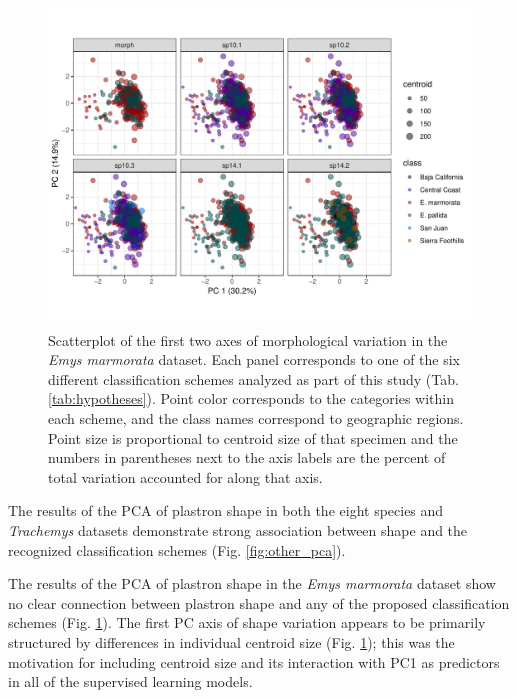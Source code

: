 \documentclass[fleqn,10pt,lineno]{wlpeerj} %
\begin{document}
\afterpage{\clearpage}
\begin{figure}[ht]
  \centering
  \includegraphics[height = \textheight, width = \textwidth, keepaspectratio = true]{figure/emys_pc_graph}
  \caption{Scatterplot of the first two axes of morphological variation in the \textit{Emys marmorata} dataset. Each panel corresponds to one of the six different classification schemes analyzed as part of this study (Tab. \ref{tab:hypotheses}). Point color corresponds to the categories within each scheme, and the class names correspond to geographic regions. Point size is proportional to centroid size of that specimen and the numbers in parentheses next to the axis labels are the percent of total variation accounted for along that axis.}
  \label{fig:emys_pca}
\end{figure}

The results of the PCA of plastron shape in both the eight species and \textit{Trachemys} datasets demonstrate strong association between shape and the recognized classification schemes (Fig. \ref{fig:other_pca}).

The results of the PCA of plastron shape in the \textit{Emys marmorata} dataset show no clear connection between plastron shape and any of the proposed classification schemes (Fig. \ref{fig:emys_pca}). The first PC axis of shape variation appears to be primarily structured by differences in individual centroid size (Fig. \ref{fig:emys_pca}); this was the motivation for including centroid size and its interaction with PC1 as predictors in all of the supervised learning models.
\end{document}
